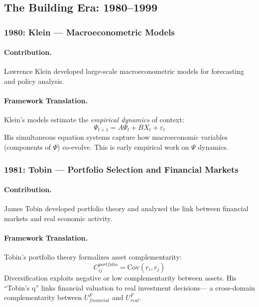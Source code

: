 \subsection{The Building Era: 1980--1999}

\subsubsection{1980: Klein --- Macroeconometric Models}

\paragraph{Contribution.}
Lawrence Klein developed large-scale macroeconometric models for forecasting
and policy analysis.

\paragraph{Framework Translation.}
Klein's models estimate the \emph{empirical dynamics} of context:
\begin{equation}
  \Psi_{t+1} = A \Psi_t + B X_t + \varepsilon_t
\end{equation}
His simultaneous equation systems capture how macroeconomic variables
(components of $\Psi$) co-evolve. This is early empirical work on $\Psi$ dynamics.

\subsubsection{1981: Tobin --- Portfolio Selection and Financial Markets}

\paragraph{Contribution.}
James Tobin developed portfolio theory and analyzed the link between
financial markets and real economic activity.

\paragraph{Framework Translation.}
Tobin's portfolio theory formalizes asset complementarity:
\begin{equation}
  C^{portfolio}_{ij} = \text{Cov}(r_i, r_j)
\end{equation}
Diversification exploits negative or low complementarity between assets.
His ``Tobin's q'' links financial valuation to real investment decisions---
a cross-domain complementarity between $U^F_{financial}$ and $U^F_{real}$.

